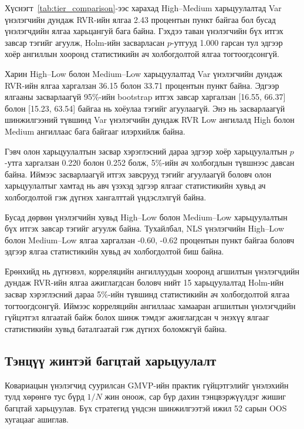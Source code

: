 Хүснэгт~\ref{tab:tier_comparison}-ээс
харахад High--Medium харьцуулалтад
Var үнэлэгчийн дундаж RVR-ийн ялгаа
2.43 процентын пункт байгаа бол
бусад үнэлэгчдийн ялгаа харьцангуй
бага байна. Гэхдээ таван үнэлэгчийн
бүх итгэх завсар тэгийг агуулж,
Holm-ийн засварласан $p$-утгууд
1.000 гарсан тул эдгээр хоёр
ангиллын хооронд статистикийн
ач холбогдолтой ялгаа тогтоогдсонгүй.

Харин High--Low болон Medium--Low
харьцуулалтад Var үнэлэгчийн
дундаж RVR-ийн ялгаа харгалзан
36.15 болон 33.71 процентын пункт
байна. Эдгээр ялгааны засварлаагүй
95\%-ийн bootstrap итгэх завсар
харгалзан [16.55, 66.37] болон
[15.23, 63.54] байгаа нь
хоёулаа тэгийг агуулаагүй.
Энэ нь засварлаагүй шинжилгээний
түвшинд Var үнэлэгчийн дундаж
RVR Low ангилалд High болон
Medium ангиллаас бага байгааг
илэрхийлж байна.

Гэвч олон харьцуулалтын засвар
хэрэглэсний дараа эдгээр хоёр
харьцуулалтын $p$-утга харгалзан
0.220 болон 0.252 болж,
5\%-ийн ач холбогдлын түвшнээс
давсан байна. Иймээс засварлаагүй
итгэх завсрууд тэгийг агуулаагүй
боловч олон харьцуулалтыг
хамтад нь авч үзэхэд эдгээр
ялгааг статистикийн хувьд
ач холбогдолтой гэж дүгнэх
хангалттай үндэслэлгүй байна.

Бусад дөрвөн үнэлэгчийн хувьд
High--Low болон Medium--Low
харьцуулалтын бүх итгэх завсар
тэгийг агуулж байна. Тухайлбал,
NLS үнэлэгчийн High--Low болон
Medium--Low ялгаа харгалзан
-0.60, -0.62 процентын пункт
байгаа боловч эдгээр ялгаа
статистикийн хувьд ач
холбогдолтой биш байна.

Ерөнхийд нь дүгнэвэл,
корреляцийн ангиллуудын хооронд
агшилтын үнэлэгчдийн дундаж
RVR-ийн ялгаа ажиглагдсан
боловч нийт 15 харьцуулалтад
Holm-ийн засвар хэрэглэсний
дараа 5\%-ийн түвшинд
статистикийн ач холбогдолтой
ялгаа тогтоогдсонгүй.
Иймээс корреляцийн ангиллаас
хамааран агшилтын үнэлэгчдийн
гүйцэтгэл ялгаатай байж болох
шинж тэмдэг ажиглагдсан ч
энэхүү ялгааг статистикийн
хувьд баталгаатай гэж
дүгнэх боломжгүй байна.


\subsection{Тэнцүү жинтэй багцтай харьцуулалт}
\label{subsec:equal_weight_results}

Ковариацын үнэлэгчид суурилсан GMVP-ийн
практик гүйцэтгэлийг үнэлэхийн тулд
хөрөнгө тус бүрд $1/N$ жин оноож,
сар бүр дахин тэнцвэржүүлдэг жишиг
багцтай харьцуулав. Бүх стратегид
үндсэн шинжилгээтэй ижил 52 сарын
OOS хугацааг ашиглав.

